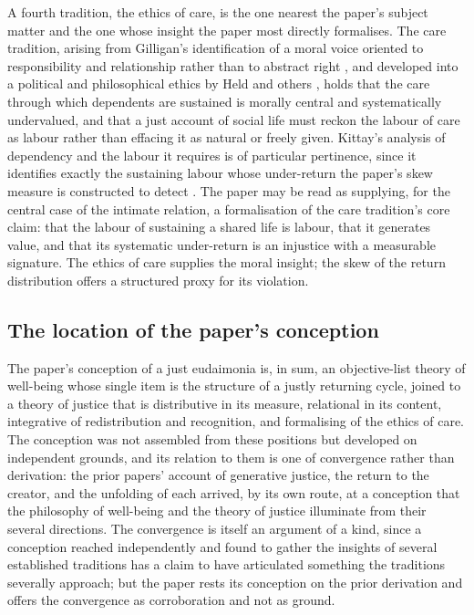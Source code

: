 A fourth tradition, the ethics of care, is the one nearest the paper's subject matter and the one whose insight the paper most directly formalises. The care tradition, arising from Gilligan's identification of a moral voice oriented to responsibility and relationship rather than to abstract right \parencite{gilligan1982}, and developed into a political and philosophical ethics by Held and others \parencite{held2006}, holds that the care through which dependents are sustained is morally central and systematically undervalued, and that a just account of social life must reckon the labour of care as labour rather than effacing it as natural or freely given. Kittay's analysis of dependency and the labour it requires is of particular pertinence, since it identifies exactly the sustaining labour whose under-return the paper's skew measure is constructed to detect \parencite{kittay1999}. The paper may be read as supplying, for the central case of the intimate relation, a formalisation of the care tradition's core claim: that the labour of sustaining a shared life is labour, that it generates value, and that its systematic under-return is an injustice with a measurable signature. The ethics of care supplies the moral insight; the skew of the return distribution offers a structured proxy for its violation.

\subsection{The location of the paper's conception}
\label{p11:sec:phil-location}

The paper's conception of a just eudaimonia is, in sum, an objective-list theory of well-being whose single item is the structure of a justly returning cycle, joined to a theory of justice that is distributive in its measure, relational in its content, integrative of redistribution and recognition, and formalising of the ethics of care. The conception was not assembled from these positions but developed on independent grounds, and its relation to them is one of convergence rather than derivation: the prior papers' account of generative justice, the return to the creator, and the unfolding of each arrived, by its own route, at a conception that the philosophy of well-being and the theory of justice illuminate from their several directions. The convergence is itself an argument of a kind, since a conception reached independently and found to gather the insights of several established traditions has a claim to have articulated something the traditions severally approach; but the paper rests its conception on the prior derivation and offers the convergence as corroboration and not as ground.
